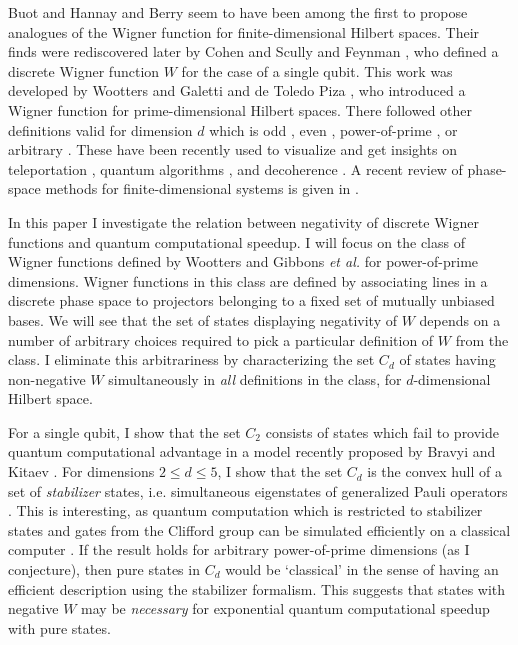 \documentclass[aps,twocolumn,showpacs,nofootinbib,groupedaddress]{revtex4}
\begin{document}
Buot \cite{Buot74} and Hannay and Berry \cite{HannayB80} seem to
have been among the first to propose analogues of the Wigner
function for finite-dimensional Hilbert spaces. Their finds were
rediscovered later by Cohen and Scully \cite{CohenS86} and Feynman
\cite{Feynman87}, who defined a discrete Wigner function $W$ for
the case of a single qubit. This work was developed by Wootters
\cite{Wootters87} and Galetti and de Toledo Piza
\cite{GalettiP88}, who introduced a Wigner function  for
prime-dimensional Hilbert spaces. There followed other definitions
valid for dimension $d$ which is odd \cite{CohendetCSS-C88}, even
\cite{Leonhardt95}, power-of-prime \cite{Wootters04, GibbonsHW04},
or arbitrary \cite{RivasOdA99,BianucciMPS02,MiquelPS02}. These
have been recently used to visualize and get insights on
teleportation \cite{KoniorczykBJ01,Paz02}, quantum algorithms
\cite{BianucciMPS02,MiquelPS02}, and decoherence \cite{LopezP03}.
A recent review of phase-space methods for finite-dimensional
systems is given in \cite{Vourdas04}.

In this paper I investigate the relation between negativity of
discrete Wigner functions and quantum computational speedup. I
will focus on the class of Wigner functions defined by Wootters
\cite{Wootters04} and Gibbons \textit{et al.} \cite{GibbonsHW04}
for power-of-prime dimensions. Wigner functions in this class are
defined by associating lines in a discrete phase space to
projectors belonging to a fixed set of mutually unbiased bases. We
will see that the set of states displaying negativity of $W$
depends on a number of arbitrary choices required to pick a
particular definition of $W$ from the class. I eliminate this
arbitrariness by characterizing the set $C_d$ of states having
non-negative $W$ simultaneously in \textit{all} definitions in the
class, for $d$-dimensional Hilbert space.

For a single qubit, I show that the set $C_2$ consists of states
which fail to provide quantum computational advantage in a model
recently proposed by Bravyi and Kitaev \cite{BravyiK04}. For
dimensions $2\le d \le 5$, I show that the set $C_d$ is the convex
hull of a set of \textit{stabilizer} states, i.e. simultaneous
eigenstates of generalized Pauli operators
\cite{Gottesman97,Gottesman99b}. This is interesting, as quantum
computation which is restricted to stabilizer states and gates
from the Clifford group can be simulated efficiently on a
classical computer \cite{Gottesman99}. If the result holds for
arbitrary power-of-prime dimensions (as I conjecture), then pure
states in $C_d$ would be `classical' in the sense of having an
efficient description using the stabilizer formalism. This
suggests that states with negative $W$ may be \textit{necessary}
for exponential quantum computational speedup with pure states.
\end{document}
